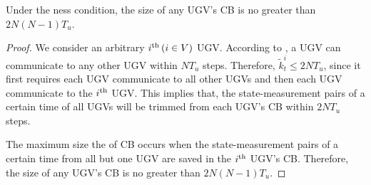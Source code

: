 	
	\begin{cor}\label{thm:max_CB_size}
		Under the \fc ness condition, the size of any UGV's CB is no greater than $2N(N-1)T_u$.
	\end{cor}
	
	\begin{proof}
		We consider an arbitrary $i^\text{th}\,(i\in V)$ UGV.
		According to , a UGV can communicate to any other UGV within $NT_u$ steps.
		Therefore, $\tilde{k}^i_t\le 2NT_u$, since it first requires each UGV communicate to all other UGVs and then each UGV communicate to the $i^\text{th}$ UGV.
		This implies that, the state-measurement pairs of a certain time of all UGVs will be trimmed from each UGV's CB within $2NT_u$ steps.

		The maximum size the of CB occurs when the state-measurement pairs of a certain time from all but one UGV are saved in the $i^\text{th}$ UGV's CB.
		Therefore, the size of any UGV's CB is no greater than $2N(N-1)T_u$.		
		
	\end{proof}
	
%		
	
